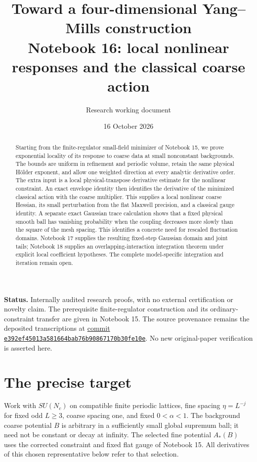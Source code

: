 \documentclass[11pt]{article}
\title{Toward a four-dimensional Yang--Mills construction\\
\large Notebook 16: local nonlinear responses and the classical coarse action}
\author{Research working document}
\date{16 October 2026}
\theoremstyle{remark}
\begin{document}
\maketitle
\begin{abstract}
Starting from the finite-regulator small-field minimizer of
Notebook 15, we prove exponential locality of its response to
coarse data at small nonconstant backgrounds. The bounds are
uniform in refinement and periodic volume, retain the same
physical H\"older exponent, and allow one weighted direction
at every analytic derivative order. The extra input is a local
physical-transpose derivative estimate for the nonlinear
constraint. An exact envelope identity then identifies the
derivative of the minimized classical action with the coarse
multiplier. This supplies a local nonlinear coarse Hessian,
its small perturbation from the flat Maxwell precision, and a
classical gauge identity. A separate exact Gaussian trace
calculation shows that a fixed physical smooth ball has vanishing
probability when the coupling decreases more slowly than the
square of the mesh spacing. This identifies a concrete need for
rescaled fluctuation domains. Notebook 17 supplies the resulting
fixed-step Gaussian domain and joint tails; Notebook 18 supplies
an overlapping-interaction integration theorem under explicit local
coefficient hypotheses. The complete model-specific integration
and iteration remain open.
\end{abstract}

\noindent\textbf{Status.}
Internally audited research proofs, with no external certification
or novelty claim. The prerequisite finite-regulator construction
and its ordinary-constraint transfer are given in Notebook 15.
The source provenance remains the deposited transcriptions at
\href{https://github.com/ethanwsussman/Yang--Mills-LLM-experiment/tree/e392ef45013a581664bab76b90867170b30fe10e}{commit
\texttt{e392ef45013a581664bab76b90867170b30fe10e}}.
No new original-paper verification is asserted here.

\section{The precise target}
\label{nr16-target}

Work with $SU(N_c)$ on compatible finite periodic lattices,
fine spacing $\eta=L^{-j}$ for fixed odd $L\ge3$, coarse
spacing one, and fixed $0<\alpha<1$. The background coarse
potential $B$ is arbitrary in a sufficiently small global
supremum ball; it need not be constant or decay at infinity.
The selected fine potential $A_*(B)$ uses the corrected
constraint and fixed flat gauge of Notebook 15. All derivatives
of this chosen representative below refer to that selection.
\end{document}
